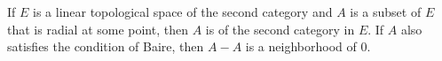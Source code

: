 If $E$ is a linear topological space of the second category and $A$ is a subset of $E$ that is radial at some point, then $A$ is of the second category in $E$. If $A$ also satisfies the condition of Baire, then $A - A$ is a neighborhood of 0.
